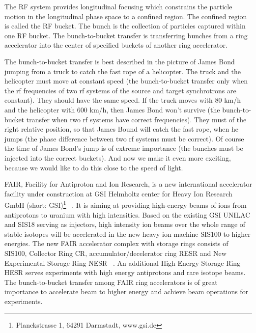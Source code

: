 %

The RF system provides longitudinal focusing which constrains the particle motion in the longitudinal phase space to a confined region. The confined region is called the RF bucket. The bunch is the collection of particles captured within one RF bucket. The bunch-to-bucket transfer is transferring bunches from a ring accelerator into the center of specified buckets of another ring accelerator.  

The bunch-to-bucket transfer is best described in the picture of James Bond jumping from a truck to catch the fast rope of a helicopter. The truck and the helicopter must move at constant speed (the bunch-to-bucket transfer only when the rf frequencies of two rf systems of the source and target synchrotrons are constant). They should have the same speed. If the truck moves with 80 km/h and the helicopter with 600 km/h, then James Bond won't survive (the bunch-to-bucket transfer when two rf systems have correct frequencies). They must of the right relative position, so that James Bound will catch the fast rope, when he jumps (the phase difference between two rf systems must be correct). Of course the time of James Bond’s jump is of extreme importance (the bunches must be injected into the correct buckets). And now we make it even more exciting, because we would like to do this close to the speed of light.

FAIR, Facility for Antiproton and Ion Research, is a new international accelerator facility under construction at GSI Helmholtz center for Heavy Ion Research GmbH (short: GSI)\footnote{Planckstrasse 1, 64291 Darmstadt, www.gsi.de} ~\cite{eschke_international_2005, _fair_2011}. It is aiming at providing high-energy beams of ions from antiprotons to uranium with high intensities.  Based on the existing GSI \gls{UNILAC} and SIS18 serving as injectors, high intensity ion beams over the whole range of stable isotopes will be accelerated in the new heavy ion machine SIS100 to higher energies. The new FAIR accelerator complex with storage rings consists of SIS100, Collector Ring CR, accumulator/decelerator ring RESR and New Experimental Storage Ring NESR ~\cite{spiller_fair_2006, steck_advanced_2008}. An additional High Energy Storage Ring HESR serves experiments with high energy antiprotons and rare isotope beams. The bunch-to-bucket transfer among FAIR ring accelerators is of great importance to accelerate beam to higher energy and achieve beam operations for experiments.

